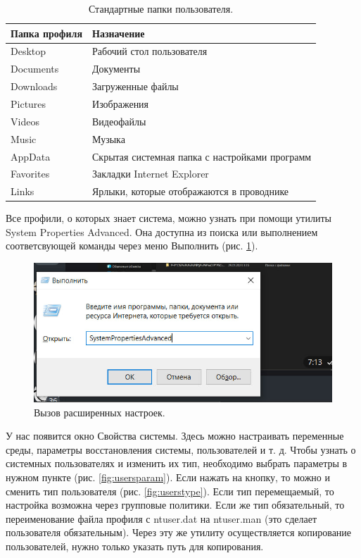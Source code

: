\begin{table}[h!]
    \centering
    \caption{Стандартные папки пользователя.}
    \label{tab:tab 1.1}
    \vspace{10}
    \begin{tabular}{|l|l|}
\hline
Папка профиля&Назначение\\
\hline
Desktop&Рабочий стол пользователя\\
\hline
Documents&Документы\\
\hline
Downloads&Загруженные файлы\\
\hline
Pictures&Изображения\\
\hline
Videos&Видеофайлы\\
\hline
Music&Музыка\\
\hline
AppData&Скрытая системная папка с настройками программ\\
\hline
Favorites&Закладки Internet Explorer\\
\hline
Links&Ярлыки, которые отображаются в проводнике\\
\hline

    \end{tabular}
\end{table}

Все профили, о которых знает система, можно узнать при помощи утилиты System Properties Advanced. Она доступна из поиска или выполнением соответсвующей команды через меню Выполнить (рис. \ref{fig:PropAdvanced}). 

\begin{figure}[h!]
    \centering
    \includegraphics[width=0.5\linewidth]{Pic/lab1/photo_2025-05-21_08-15-28.jpg}
    \caption{Вызов расширенных настроек.}
    \label{fig:PropAdvanced}
\end{figure}

У нас появится окно Свойства системы. Здесь можно настраивать переменные среды, параметры восстановления системы, пользователей и т. д. Чтобы узнать о системных пользователях и изменить их тип, необходимо выбрать параметры в нужном пункте (рис. \ref{fig:usersparam}). Если нажать на кнопку, то можно и сменить тип пользователя (рис. \ref{fig:userstype}). Если тип перемещаемый, то настройка возможна через групповые политики. Если же тип обязательный, то переименование файла профиля с ntuser.dat на ntuser.man (это сделает пользователя обязательным). Через эту же утилиту осуществляется копирование пользователей, нужно только указать путь для копирования.


